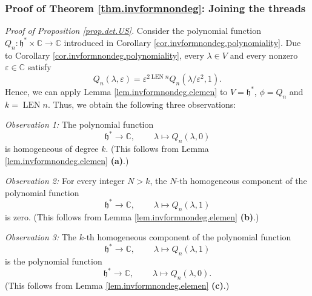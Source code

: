 \documentclass
[numbers=enddot,12pt,final,onecolumn,german,notitlepage]{scrartcl}%
\theoremstyle{definition}
\begin{document}
\subsubsection{Proof of Theorem \ref{thm.invformnondeg}: Joining the threads}

\textit{Proof of Proposition \ref{prop.det.US}.} Consider the polynomial
function $Q_{n}:\mathfrak{h}^{\ast}\times\mathbb{C}\rightarrow\mathbb{C}$
introduced in Corollary \ref{cor.invformnondeg.polynomiality}. Due to
Corollary \ref{cor.invformnondeg.polynomiality}, every $\lambda\in V$ and
every nonzero $\varepsilon\in\mathbb{C}$ satisfy%
\[
Q_{n}\left(  \lambda,\varepsilon\right)  =\varepsilon^{2\operatorname*{LEN}%
n}Q_{n}\left(  \lambda/\varepsilon^{2},1\right)  .
\]
Hence, we can apply Lemma \ref{lem.invformnondeg.elemen} to $V=\mathfrak{h}%
^{\ast}$, $\phi=Q_{n}$ and $k=\operatorname*{LEN}n$. Thus, we obtain the
following three observations:

\textit{Observation 1:} The polynomial function
\[
\mathfrak{h}^{\ast}\rightarrow\mathbb{C},\ \ \ \ \ \ \ \ \ \ \lambda\mapsto
Q_{n}\left(  \lambda,0\right)
\]
is homogeneous of degree $k$. (This follows from Lemma
\ref{lem.invformnondeg.elemen} \textbf{(a)}.)

\textit{Observation 2:} For every integer $N>k$, the $N$-th homogeneous
component of the polynomial function%
\[
\mathfrak{h}^{\ast}\rightarrow\mathbb{C},\ \ \ \ \ \ \ \ \ \ \lambda\mapsto
Q_{n}\left(  \lambda,1\right)
\]
is zero. (This follows from Lemma \ref{lem.invformnondeg.elemen} \textbf{(b)}.)

\textit{Observation 3:} The $k$-th homogeneous component of the polynomial
function%
\[
\mathfrak{h}^{\ast}\rightarrow\mathbb{C},\ \ \ \ \ \ \ \ \ \ \lambda\mapsto
Q_{n}\left(  \lambda,1\right)
\]
is the polynomial function%
\[
\mathfrak{h}^{\ast}\rightarrow\mathbb{C},\ \ \ \ \ \ \ \ \ \ \lambda\mapsto
Q_{n}\left(  \lambda,0\right)  .
\]
(This follows from Lemma \ref{lem.invformnondeg.elemen} \textbf{(c)}.)
\end{document}
